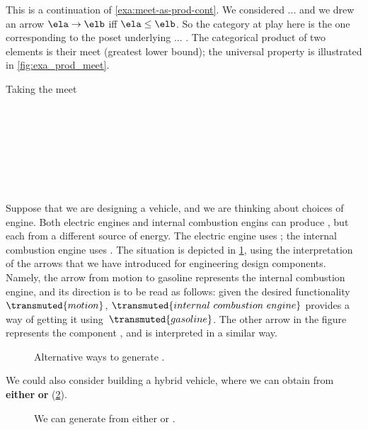 \begin{example}\label{exa:meet-as-prod-cont}
This is a continuation of \cref{exa:meet-as-prod-cont}. We considered ... and we drew an arrow $\ela \to \elb$ iff $\ela \leq \elb$. So the category at play here is the one corresponding to the poset underlying ... . The categorical product of two elements is their meet (greatest lower bound); the universal property is illustrated in \cref{fig:exa_prod_meet}. 
  \begin{marginfigure}
  \begin{center}
  \end{center}
    \caption{Taking the meet}
    \label{fig:exa_prod_meet_cont}
  \end{marginfigure}
\end{example}



\

\

\

\



\begin{example}
  Suppose that we are designing a vehicle, and we are thinking about choices of engine. Both electric engines and internal combustion engins can produce , but each from a different source of energy. The electric engine uses ; the internal combustion engine uses . The situation is depicted in \cref{fig:e14}, using the interpretation of the arrows that we have introduced for engineering design components. Namely, the arrow from motion to gasoline represents the internal combustion engine, and its direction is to be read as follows: given the desired functionality~$\transmuted{motion}$, $\transmuted{internal \ combustion \ engine}$ provides a way of getting it using~$\transmuted{gasoline}$. The other arrow in the figure represents the component , and is interpreted in a similar way.


  \begin{figure}[h!]
    \centering
    \caption{Alternative ways to generate . }
    \label{fig:e14}
  \end{figure}

  We could also consider building a hybrid vehicle, where we can obtain  from \textbf{either}  \textbf{or}  (\cref{fig:e15}).

  \begin{figure}[h!]
    \centering
    \caption{We can generate  from either  or  .}
    \label{fig:e15}
  \end{figure}
\end{example}

